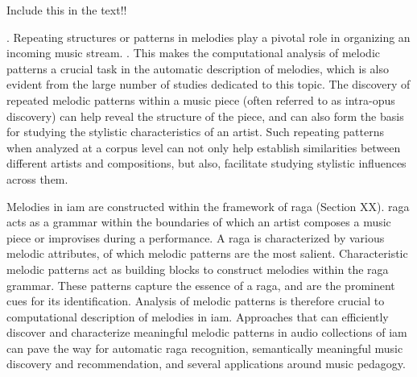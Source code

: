 Include this in the text!!
%

. Repeating structures or patterns in melodies play a pivotal role in organizing an incoming music stream. . This makes the computational analysis of melodic patterns a crucial task in the automatic description of melodies, which is also evident from the large number of studies dedicated to this topic. The discovery of repeated melodic patterns within a music piece (often referred to as intra-opus discovery) can help reveal the structure of the piece, and can also form the basis for studying the stylistic characteristics of an artist. Such repeating patterns when analyzed at a corpus level can not only help establish similarities between different artists and compositions, but also, facilitate studying stylistic influences across them. 

Melodies in \gls{iam} are constructed within the framework of \gls{raga} (Section XX). \gls{raga} acts as a grammar within the boundaries of which an artist composes a music piece or improvises during a performance. A \gls{raga} is characterized by various melodic attributes, of which melodic patterns are the most salient. Characteristic melodic patterns act as building blocks to construct melodies within the \gls{raga} grammar. These patterns capture the essence of a \gls{raga}, and are the prominent cues for its identification. Analysis of melodic patterns is therefore crucial to computational description of melodies in \gls{iam}. Approaches that can efficiently discover and characterize meaningful melodic patterns in audio collections of \gls{iam} can pave the way for automatic \gls{raga} recognition, semantically meaningful music discovery and recommendation, and several applications around music pedagogy.

